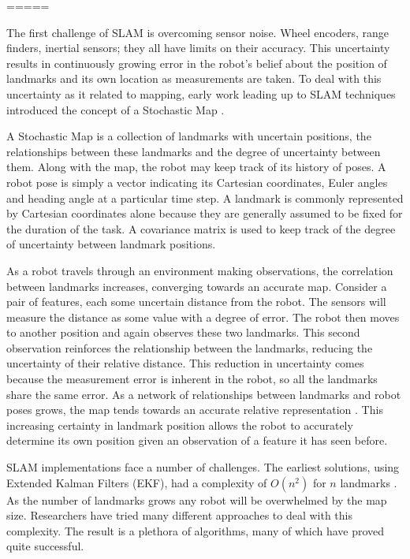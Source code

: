 \documentclass[12pt]{article}
\begin{document}
=====

The first challenge of SLAM is overcoming sensor noise.  Wheel encoders, range finders, inertial sensors; they all have limits on their accuracy.  This uncertainty results in continuously growing error in the robot's belief about the position of landmarks and its own location as measurements are taken.  To deal with this uncertainty as it related to mapping, early work leading up to SLAM techniques introduced the concept of a Stochastic Map \cite{cheeseman1987stochastic}.  

A Stochastic Map is a collection of landmarks with uncertain positions, the relationships between these landmarks and the degree of uncertainty between them.  Along with the map, the robot may keep track of its history of poses.  A robot pose is simply a vector indicating its Cartesian coordinates, Euler angles and heading angle at a particular time step.  A landmark is commonly represented by Cartesian coordinates alone because they are generally assumed to be fixed for the duration of the task.  A covariance matrix is used to keep track of the degree of uncertainty between landmark positions.

As a robot travels through an environment making observations, the correlation between landmarks increases, converging towards an accurate map.  Consider a pair of features, each some uncertain distance from the robot.  The sensors will measure the distance as some value with a degree of error.  The robot then moves to another position and again observes these two landmarks.  This second observation reinforces the relationship between the landmarks, reducing the uncertainty of their relative distance.  This reduction in uncertainty comes because the measurement error is inherent in the robot, so all the landmarks share the same error.  As a network of relationships between landmarks and robot poses grows, the map tends towards an accurate relative representation \cite{durrant2006simultaneous}.  This increasing certainty in landmark position allows the robot to accurately determine its own position given an observation of a feature it has seen before.

SLAM implementations face a number of challenges.  The earliest solutions, using Extended Kalman Filters (EKF), had a complexity of $O(n^2)$ for $n$ landmarks \cite{ThrunPR2005}.  As the number of landmarks grows any robot will be overwhelmed by the map size.  Researchers have tried many different approaches to deal with this complexity.  The result is a plethora of algorithms, many of which have proved quite successful.  
\end{document}
